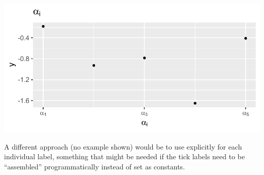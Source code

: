 \documentclass[krantz2]{krantz}\usepackage{knitr}
\begin{document}
\begin{knitrout}\footnotesize
{}\color{fgcolor}\begin{kframe}
\begin{alltt}
 \hlkwb{<-} 
  \hlopt{+}
   \hlstd{()} \hlopt{+}
   \hlstd{(} \hlstd{=} \hlstd{(}  \hlopt{+}
   \hlstd{(} \hlstd{=} 
                       \hlstd{=} \hlstd{(}\hlstd{,}\hlstd{,}\hlstd{),}
                       \hlstd{=} \hlstd{(alpha[}\hlstd{], alpha[}\hlstd{], alpha[}\hlstd{]))}
\end{alltt}
\end{kframe}

{\centering \includegraphics[width=.7\textwidth]{figure/pos-plotmath-02a-1} 

}


\end{knitrout}

A different approach (no example shown) would be to use  explicitly for each individual label, something that might be needed if the tick labels need to be ``assembled'' programmatically instead of set as constants.
\end{document}
